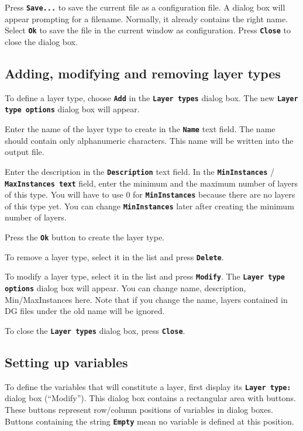\documentclass[12pt]{report}
\begin{document}
Press \textbf{\texttt{Save...}} to save the current file
as a configuration file. A dialog box will appear prompting for a
filename. Normally, it already contains the right name. Select
\textbf{\texttt{Ok}} to save the file in the current window as
configuration.
Press \textbf{\texttt{Close}} to close the dialog box.

\subsection{Adding, modifying and removing layer types}

To define a layer type, choose \textbf{\texttt{Add}} in the
\textbf{\texttt{Layer types}} dialog box. The new \textbf{\texttt{Layer
type options}} dialog box will appear.

Enter the name of the layer type to create in the
\textbf{\texttt{Name}} text field. The name should contain only
alphanumeric characters. This name will be written into the output
file.

Enter the description in the \textbf{\texttt{Description}} text field.
In the \textbf{\texttt{MinInstances}} / \textbf{\texttt{MaxInstances
text}} field, enter the minimum and the maximum number of layers of
this type. You will have to use 0 for \textbf{\texttt{MinInstances}}
because there are no layers of this type yet. You can change
\textbf{\texttt{MinInstances}} later after creating the minimum number
of layers.

Press the \textbf{\texttt{Ok}} button to create the layer type.

To remove a layer type, select it in the list and press
\textbf{\texttt{Delete}}.

To modify a layer type, select it in the list and press
\textbf{\texttt{Modify}}. The \textbf{\texttt{Layer type options}}
dialog box will appear. You can change name, description,
Min/MaxInstances here. Note that if you change the name, layers
contained in DG files under the old name will be ignored.

To close the \textbf{\texttt{Layer types}} dialog box, press
\textbf{\texttt{Close}}.

\subsection{Setting up variables}

To define the variables that will constitute a layer, first display its
\textbf{\texttt{Layer type:}} dialog box (``Modify''). This dialog
box contains a rectangular area with buttons. These buttons represent
row/column positions of variables in dialog boxes. Buttons containing
the string \textbf{\texttt{Empty}} mean no variable is defined at this
position.
\end{document}
